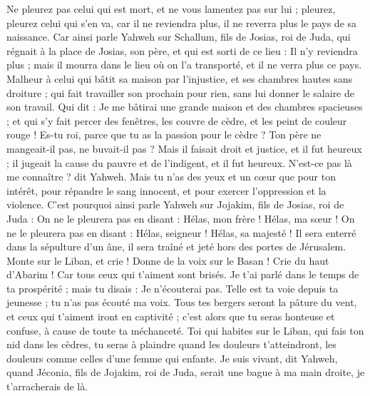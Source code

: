 \begin{multicols}{2}
Ne pleurez pas celui qui est mort, et ne vous lamentez pas sur lui ; pleurez, pleurez celui qui s'en va, car il ne reviendra plus, il ne reverra plus le pays de sa naissance.
Car ainsi parle Yahweh sur Schallum, fils de Josias, roi de Juda, qui régnait à la place de Josias, son père, et qui est sorti de ce lieu : Il n'y reviendra plus ;
mais il mourra dans le lieu où on l'a transporté, et il ne verra plus ce pays.
Malheur à celui qui bâtit sa maison par l'injustice, et ses chambres hautes sans droiture ; qui fait travailler son prochain pour rien, sans lui donner le salaire de son travail.
Qui dit : Je me bâtirai une grande maison et des chambres spacieuses ; et qui s’y fait percer des fenêtres, les couvre de cèdre, et les peint de couleur rouge !
Es-tu roi, parce que tu as la passion pour le cèdre ? Ton père ne mangeait-il pas, ne buvait-il pas ? Mais il faisait droit et justice, et il fut heureux ;
il jugeait la cause du pauvre et de l’indigent, et il fut heureux. N’est-ce pas là me connaître ? dit Yahweh.
Mais tu n’as des yeux et un cœur que pour ton intérêt, pour répandre le sang innocent, et pour exercer l’oppression et la violence.
C'est pourquoi ainsi parle Yahweh sur Jojakim, fils de Josias, roi de Juda : On ne le pleurera pas en disant : Hélas, mon frère ! Hélas, ma sœur ! On ne le pleurera pas en disant : Hélas, seigneur ! Hélas, sa majesté !
Il sera enterré dans la sépulture d'un âne, il sera traîné et jeté hors des portes de Jérusalem.
Monte sur le Liban, et crie ! Donne de la voix sur le Basan ! Crie du haut d’Abarim ! Car tous ceux qui t’aiment sont brisés.
Je t'ai parlé dans le temps de ta prospérité ; mais tu disais : Je n'écouterai pas. Telle est ta voie depuis ta jeunesse ; tu n'as pas écouté ma voix.
Tous tes bergers seront la pâture du vent, et ceux qui t’aiment iront en captivité ; c’est alors que tu seras honteuse et confuse, à cause de toute ta méchanceté.
Toi qui habites sur le Liban, qui fais ton nid dans les cèdres,  tu seras à plaindre quand les douleurs t’atteindront, les douleurs comme celles d’une femme qui enfante.
Je suis vivant, dit Yahweh, quand Jéconia, fils de Jojakim, roi de Juda, serait une bague à ma main droite, je t'arracherais de là.

\end{multicols}
